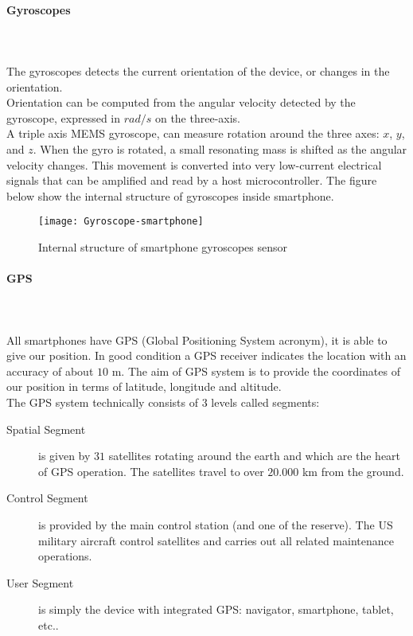 \documentclass[tesi]{subfiles}
\begin{document}
\paragraph{{\Large Gyroscopes}}\leavevmode\\\\
The gyroscopes detects the current orientation of the device, or
changes in the orientation.\\ Orientation can be computed from the
angular velocity detected by the gyroscope, expressed in $rad/s$ on the three-axis.\\ 
A triple axis MEMS gyroscope, can measure rotation around the three axes: $x$, $y$, and $z$.
When the gyro is rotated, a small resonating mass is shifted as the angular velocity changes. This movement is converted into very low-current electrical signals that can be amplified and read by a host microcontroller.
The figure below show the internal structure of gyroscopes inside smartphone.


\vspace{1cm}
\begin{figure}[h]
\centering
\texttt{[image: Gyroscope-smartphone]}
\caption{Internal structure of smartphone gyroscopes sensor}
\label{fig:Sample smartphone accelerometer sensors}
\end{figure}
\clearpage
\paragraph{{\Large GPS}}\leavevmode\\\\
All smartphones have GPS (Global Positioning System acronym), it is able to give our position. In good condition a GPS receiver indicates the location with an accuracy of about $10$ \si{\meter}. The aim of GPS system is to provide the coordinates of our position in terms of latitude, longitude and altitude.\\
The GPS system technically consists of 3 levels called segments:
\begin{description}
\item [Spatial Segment] is given by $31$ satellites rotating around the earth and which are the heart of GPS operation. The satellites travel to over $20.000$ \si{\km} from the ground.
\item [Control Segment] is provided by the main control station (and one of the reserve). The US military aircraft control satellites and carries out all related maintenance operations.
\item [User Segment] is simply the device with integrated GPS: navigator, smartphone, tablet, etc..
\end{description}
\end{document}
